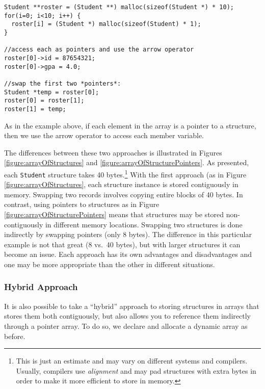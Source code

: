 \begin{verbatim}
Student **roster = (Student **) malloc(sizeof(Student *) * 10);
for(i=0; i<10; i++) {
  roster[i] = (Student *) malloc(sizeof(Student) * 1);
}

//access each as pointers and use the arrow operator
roster[0]->id = 87654321;
roster[0]->gpa = 4.0;

//swap the first two *pointers*:
Student *temp = roster[0];
roster[0] = roster[1];
roster[1] = temp;
\end{verbatim}

As in the example above, if each element in the array is a pointer
to a structure, then we use the arrow operator to access each 
member variable.

The differences between these two approaches is illustrated in
Figures \ref{figure:arrayOfStructures} and \ref{figure:arrayOfStructurePointers}.
As presented, each \texttt{Student} structure takes 40 
bytes.\footnote{This is just an estimate and may vary on different systems
and compilers.  Usually, compilers use \emph{alignment} and may pad
structures with extra bytes in order to make it more efficient to store
in memory.}  With the first approach (as in Figure 
\ref{figure:arrayOfStructures}, each structure instance is stored 
contiguously in memory.  Swapping two records involves copying entire
blocks of 40 bytes.  In contrast, using pointers to structures as in
Figure \ref{figure:arrayOfStructurePointers} means that structures may
be stored non-contiguously in different memory locations.  Swapping
two structures is done indirectly by swapping pointers (only 8 bytes).
The difference in this particular example is not that great (8 vs.\ 40 bytes), 
but with larger structures it can become an issue.  Each approach has
its own advantages and disadvantages and one may be more appropriate 
than the other in different situations.





\subsubsection{Hybrid Approach}

It is also possible to take a ``hybrid'' approach to storing structures
in arrays that stores them both contiguously, but also allows you to reference
them indirectly through a pointer array.  To do so, we declare and allocate 
a dynamic array as before.

